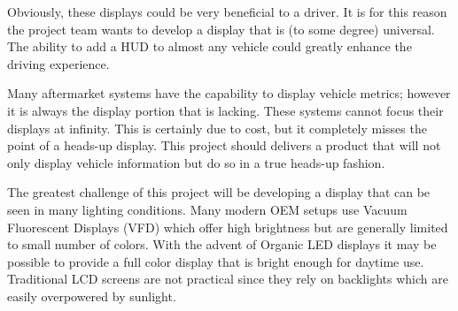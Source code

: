 Obviously, these displays could be very beneficial to a driver. It is for
this reason the project team wants to develop a display that is (to some
degree) universal. The ability to add a HUD to almost any vehicle could
greatly enhance the driving experience.

Many aftermarket systems have the capability to display vehicle
metrics; however it is always the display portion that is lacking. These
systems cannot focus their displays at infinity. This is certainly due to
cost, but it completely misses the point of a heads-up display. This
project should delivers a product that will not only display
vehicle information but do so in a true heads-up fashion.

The greatest challenge of this project will be developing a display that
can be seen in many lighting conditions. Many modern OEM setups use Vacuum
Fluorescent Displays (VFD) which offer high brightness but are generally
limited to small number of colors. With the advent of Organic LED displays
it may be possible to provide a full color display that is bright enough
for daytime use. Traditional LCD screens are not practical since they rely
on backlights which are easily overpowered by sunlight.
